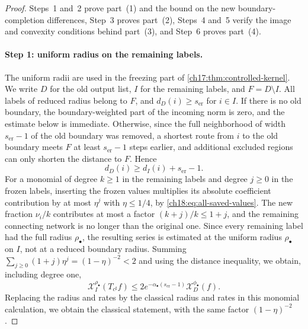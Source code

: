 \begin{proof}
Steps~1 and~2 prove part~(1) and the bound on the new boundary-completion differences, Step~3 proves part~(2), Steps~4 and~5 verify the image and convexity conditions behind part~(3), and Step~6 proves part~(4).

\paragraph{Step 1: uniform radius on the remaining labels.}
The uniform radii are used in the freezing part of \cref{ch17:thm:controlled-kernel}. We write $D$ for the old output list, $I$ for the remaining labels, and $F=D\setminus I$. All labels of reduced radius belong to $F$, and $d_D(i)\ge s_{\mathrm{er}}$ for $i\in I$. If there is no old boundary, the boundary-weighted part of the incoming norm is zero, and the estimate below is immediate. Otherwise, since the full neighborhood of width $s_{\mathrm{er}}-1$ of the old boundary was removed, a shortest route from $i$ to the old boundary meets $F$ at least $s_{\mathrm{er}}-1$ steps earlier, and additional excluded regions can only shorten the distance to $F$. Hence
\[
 d_D(i)\ge d_I(i)+s_{\mathrm{er}}-1.
\]
For a monomial of degree $k\ge1$ in the remaining labels and degree $j\ge0$ in the frozen labels, inserting the frozen values multiplies its absolute coefficient contribution by at most $\eta^j$ with $\eta\le1/4$, by \eqref{ch18:eq:all-saved-values}. The new fraction $\nu_i/k$ contributes at most a factor $(k+j)/k\le1+j$, and the remaining connecting network is no longer than the original one. Since every remaining label had the full radius $\rho_\bullet$, the resulting series is estimated at the uniform radius $\rho_\bullet$ on $I$, not at a reduced boundary radius. Summing $\sum_{j\ge0}(1+j)\eta^j=(1-\eta)^{-2}<2$ and using the distance inequality, we obtain, including degree one,
\begin{equation}\label{ch18:eq:uniform-survivor-bound}
 \mathcal X_I^{\rho_\bullet}(T_{c^\sharp}f)
 \le 2e^{-\alpha_\bullet(s_{\mathrm{er}}-1)}
                                 \mathcal X_D^{\phi_\bullet}(f).
\end{equation}
Replacing the radius and rates by the classical radius and rates in this monomial calculation, we obtain the classical statement, with the same factor $(1-\eta)^{-2}$.


\end{proof}
